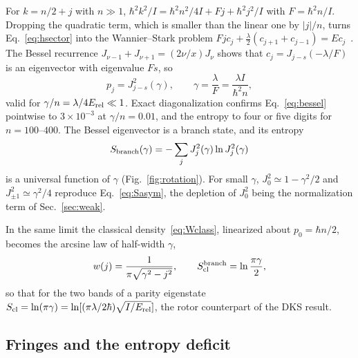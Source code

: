 \documentclass[pra,twocolumn,superscriptaddress,longbibliography,floatfix]{revtex4-2}
\newcommand{\Erel}{E_{\rm rel}}
\newcommand{\Scl}{S_{\rm cl}}
\begin{document}
For $k=n/2+j$ with $n\gg1$, $\hbar^{2}k^{2}/I=\hbar^{2}n^{2}/4I+Fj+\hbar^{2}j^{2}/I$
with $F=\hbar^{2}n/I$. Dropping the quadratic term, which is smaller than the
linear one by $|j|/n$, turns Eq.~\eqref{eq:hsector} into the Wannier--Stark
problem $Fjc_{j}+\tfrac{\lambda}{2}(c_{j+1}+c_{j-1})=Ec_{j}$~\cite{Wannier,Fukuyama}.
The Bessel recurrence $J_{\nu-1}+J_{\nu+1}=(2\nu/x)J_{\nu}$ shows that
$c_{j}=J_{j-s}(-\lambda/F)$ is an eigenvector with eigenvalue $Fs$, so
\begin{equation}
p_{j}=J_{j-s}^{2}(\gamma),\qquad \gamma=\frac{\lambda}{F}=\frac{\lambda I}{\hbar^{2}n},
\label{eq:bessel}
\end{equation}
valid for $\gamma/n=\lambda/4\Erel\ll1$. Exact diagonalization confirms
Eq.~\eqref{eq:bessel} pointwise to $3\times10^{-3}$ at $\gamma/n=0.01$, and the
entropy to four or five digits for $n=100$--$400$. The Bessel eigenvector is a
branch state, and its entropy
\begin{equation}
S_{\rm branch}(\gamma)=-\sum_{j}J_{j}^{2}(\gamma)\ln J_{j}^{2}(\gamma)
\label{eq:SB}
\end{equation}
is a universal function of $\gamma$ (Fig.~\ref{fig:rotation}). For small $\gamma$,
$J_{0}^{2}\simeq1-\gamma^{2}/2$ and $J_{\pm1}^{2}\simeq\gamma^{2}/4$ reproduce
Eq.~\eqref{eq:Sasym}, the depletion of $J_{0}^{2}$ being the normalization term
of Sec.~\ref{sec:weak}.

In the same limit the classical density~\eqref{eq:Wclass}, linearized about
$p_{0}=\hbar n/2$, becomes the arcsine law of half-width $\gamma$,
\begin{equation}
w(j)=\frac{1}{\pi\sqrt{\gamma^{2}-j^{2}}},\qquad
\Scl^{\rm branch}=\ln\frac{\pi\gamma}{2},
\label{eq:arcsine}
\end{equation}
so that for the two bands of a parity eigenstate
$\Scl=\ln(\pi\gamma)=\ln[(\pi\lambda/2\hbar)\sqrt{I/\Erel}]$, the rotor
counterpart of the DKS result.

\subsection{Fringes and the entropy deficit}
\end{document}
